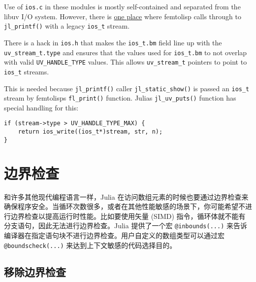 Use of \texttt{ios.c} in these modules is mostly self-contained and separated from the libuv I/O system. However, there is \href{https://github.com/JuliaLang/julia/blob/master/src/flisp/print.c\#L654}{one place} where femtolisp calls through to \texttt{jl\_printf()} with a legacy \texttt{ios\_t} stream.



There is a hack in \texttt{ios.h} that makes the \texttt{ios\_t.bm} field line up with the \texttt{uv\_stream\_t.type} and ensures that the values used for \texttt{ios\_t.bm} to not overlap with valid \texttt{UV\_HANDLE\_TYPE} values.  This allows \texttt{uv\_stream\_t} pointers to point to \texttt{ios\_t} streams.



This is needed because \texttt{jl\_printf()} caller \texttt{jl\_static\_show()} is passed an \texttt{ios\_t} stream by femtolisp{\textquotesingle}s \texttt{fl\_print()} function. Julia{\textquotesingle}s \texttt{jl\_uv\_puts()} function has special handling for this:




\begin{lstlisting}
if (stream->type > UV_HANDLE_TYPE_MAX) {
    return ios_write((ios_t*)stream, str, n);
}
\end{lstlisting}



\hypertarget{7768027532525655179}{}


\section{边界检查}



和许多其他现代编程语言一样，Julia 在访问数组元素的时候也要通过边界检查来确保程序安全。当循环次数很多，或者在其他性能敏感的场景下，你可能希望不进行边界检查以提高运行时性能。比如要使用矢量 (SIMD) 指令，循环体就不能有分支语句，因此无法进行边界检查。Julia 提供了一个宏 \texttt{@inbounds(...)} 来告诉编译器在指定语句块不进行边界检查。用户自定义的数组类型可以通过宏 \texttt{@boundscheck(...)} 来达到上下文敏感的代码选择目的。



\hypertarget{2199104062335216769}{}


\subsection{移除边界检查}



